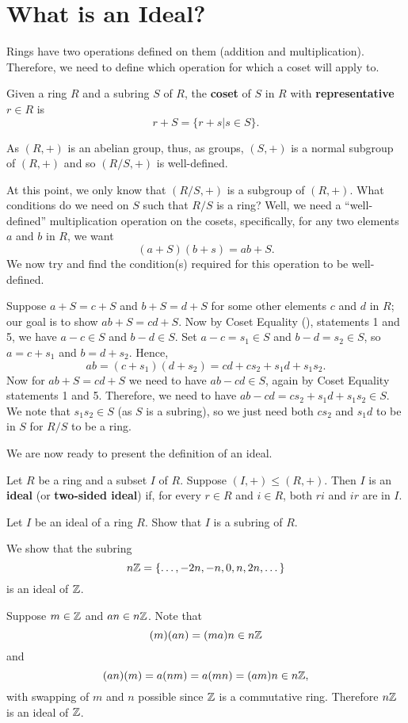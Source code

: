 \newpage

\section{What is an Ideal?}
Rings have two operations defined on them (addition and multiplication). Therefore, we need to define which operation for which a coset will apply to.
\begin{definition}
    Given a ring $R$ and a subring $S$ of $R$, the \textbf{coset} of $S$ in $R$ with \textbf{representative} $r \in R$ is
    \[
        r + S = \{r+s \vert s \in S\}.
    \]
\end{definition}
\begin{remark}
    As $(R,+)$ is an abelian group, thus, as groups, $(S,+)$ is a normal subgroup of $(R,+)$ and so $(R/S,+)$ is well-defined.
\end{remark}

At this point, we only know that $(R/S,+)$ is a subgroup of $(R,+)$. What conditions do we need on $S$ such that $R/S$ is a ring? Well, we need a ``well-defined'' multiplication operation on the cosets, specifically, for any two elements $a$ and $b$ in $R$, we want
\[
    (a+S)(b+s) = ab + S.
\]
We now try and find the condition(s) required for this operation to be well-defined.

Suppose $a+S = c+S$ and $b+S = d+S$ for some other elements $c$ and $d$ in $R$; our goal is to show $ab+S = cd+S$. Now by Coset Equality (), statements 1 and 5, we have $a-c \in S$ and $b-d \in S$. Set $a-c = s_1 \in S$ and $b-d = s_2 \in S$, so $a = c+s_1$ and $b = d+s_2$. Hence,
\[
    ab = (c+s_1)(d+s_2) = cd + cs_2 + s_1d + s_1s_2.
\]
Now for $ab + S = cd+S$ we need to have $ab-cd \in S$, again by Coset Equality statements 1 and 5. Therefore, we need to have $ab-cd = cs_2+s_1d+s_1s_2 \in S$. We note that $s_1s_2 \in S$ (as $S$ is a subring), so we just need both $cs_2$ and $s_1d$ to be in $S$ for $R/S$ to be a ring.

We are now ready to present the definition of an ideal.
\begin{definition}
    Let $R$ be a ring and a subset $I$ of $R$. Suppose $(I,+) \leq (R,+)$. Then $I$ is an \textbf{ideal} (or \textbf{two-sided ideal}) if, for every $r \in R$ and $i \in R$, both $ri$ and $ir$ are in $I$.
\end{definition}
\begin{exercise}\label{exercise-ideal-is-a-subring}
    Let $I$ be an ideal of a ring $R$. Show that $I$ is a subring of $R$.
\end{exercise}
\begin{example}\label{example-nZ-ideal-of-Z}
    We show that the subring
    \[
        n\mathbb{Z} = \{\dots, -2n, -n, 0, n, 2n, \dots\}
    \]
    is an ideal of $\mathbb{Z}$.
    
    Suppose $m \in \mathbb{Z}$ and $an \in n\mathbb{Z}$.  Note that
    \[
        (m)(an) = (ma)n \in n\mathbb{Z}
    \]
    and
    \[
        (an)(m) = a(nm) = a(mn) = (am)n \in n\mathbb{Z},
    \]
    with swapping of $m$ and $n$ possible since $\mathbb{Z}$ is a commutative ring. Therefore $n\mathbb{Z}$ is an ideal of $\mathbb{Z}$.
\end{example}

